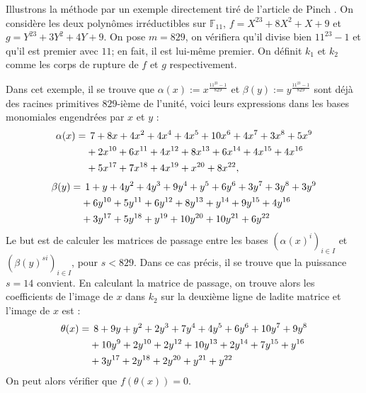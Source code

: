 \documentclass[a4paper]{article} %
\numberwithin{section}{part}
\numberwithin{equation}{section}
\newcommand\GF[1]{\mathbb{F}_{#1}}
\begin{document}
\begin{ex}
Illustrons la méthode par un exemple directement tiré de l'article de 
Pinch \cite{Pin}. On considère les deux polynômes irréductibles sur $\GF{11}$, 
$f = X^{23} + 8X^2 + X + 9$ et $g = Y^{23} + 3Y^2 + 4Y + 9$. On pose $m = 829$, 
on vérifiera qu'il divise bien $11^{23} - 1$ et qu'il est premier avec $11$; 
en fait, il est lui-même premier. On définit $k_1$ et $k_2$ comme les corps de 
rupture de $f$ et $g$ respectivement.\par
Dans cet exemple, il se trouve que $\alpha(x) := x^{\tfrac{11^{23} - 1}{829}}$ 
et $\beta(y) := y^{\tfrac{11^{23} - 1}{829}}$ sont déjà des racines primitives
$829$-ième de l'unité, voici leurs expressions dans les bases monomiales 
engendrées par $x$ et $y$ :
\begin{align*}
\alpha(x) =&\hspace{0.15cm} 7 + 8x + 4x^2 + 4x^4 + 4x^5 + 10x^6 + 4x^7 + 3x^8 + 
5x^9\\
& + 2x^{10} + 6x^{11} + 4x^{12} + 8x^{13} + 6x^{14} + 4x^{15} + 4x^{16}\\
& + 5x^{17}  + 7x^{18} + 4x^{19} + x^{20} + 8x^{22},
\end{align*}
\begin{align*}
\beta(y) =&\hspace{0.15cm}1 + y + 4y^2 + 4y^3 + 9y^4 + y^5 + 6y^6 + 3y^7 + 3y^8 
+ 3y^9\\
& + 6y^{10} + 5y^{11} + 6y^{12} + 8y^{13} + y^{14} + 9y^{15} + 4y^{16}\\
& + 3y^{17} + 5y^{18} + y^{19} + 10y^{20} + 10y^{21} + 6y^{22}
\end{align*}
Le but est de calculer les matrices de passage entre les bases
$(\alpha(x)^i)_{i\in I}$ et $(\beta(y)^{si})_{i\in I}$, pour $s < 829$.
Dans ce cas précis, il se trouve que la puissance $s = 14$ convient. En 
calculant la matrice de passage, on trouve alors les coefficients de l'image de 
$x$ dans $k_2$ sur la deuxième ligne de ladite matrice et l'image de $x$ est :
\begin{align*}
\theta(x) =&\hspace{0.15cm} 8 + 9y + y^2 + 2y^3 + 7y^4 + 4y^5 + 6y^6 + 10y^7 + 
9y^8\\
& + 10y^9 + 2y^{10} + 2y^{12} + 10y^{13} + 2y^{14} + 7y^{15} + y^{16}\\
& + 3y^{17} + 2y^{18} + 2y^{20} + y^{21} + y^{22}
\end{align*}
On peut alors vérifier que $f(\theta(x)) = 0$.
\end{ex}
\end{document}
